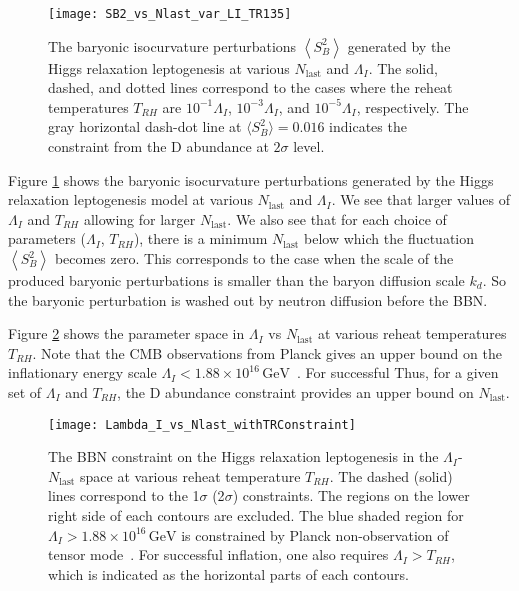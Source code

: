 \documentclass[11pt,a4paper]{article}
\begin{document}
\begin{figure}
\begin{centering}
\texttt{[image: SB2\_vs\_Nlast\_var\_LI\_TR135]} 
\par\end{centering}
\caption{The baryonic isocurvature perturbations $\left\langle S_{B}^{2}\right\rangle $ generated by the Higgs relaxation leptogenesis at various $N_{\mathrm{last}}$ and $\Lambda_{I}$. The solid, dashed, and dotted lines correspond to the cases where the reheat temperatures $T_{RH}$ are $10^{-1}\Lambda_{I}$, $10^{-3}\Lambda_{I}$, and $10^{-5}\Lambda_{I}$, respectively. The gray horizontal dash-dot line at $\langle S_B^2 \rangle = 0.016$ indicates the constraint from the D abundance at $2\sigma$ level. \label{fig:SB2 vs Nlast}}
\end{figure}

Figure \ref{fig:SB2 vs Nlast} shows the baryonic isocurvature perturbations generated by the Higgs relaxation leptogenesis model at various $N_{\mathrm{last}}$ and $\Lambda_{I}$. We see that larger values of $\Lambda_{I}$ and $T_{RH}$ allowing for larger $N_{\mathrm{last}}$. We also see that for each choice of parameters ($\Lambda_{I}$, $T_{RH}$), there is a minimum $N_{\mathrm{last}}$ below which the fluctuation $\left\langle S_{B}^{2}\right\rangle $ becomes zero. This corresponds to the case when the scale of the produced baryonic perturbations is smaller than the baryon diffusion scale $k_{d}$. So the baryonic perturbation is washed out by neutron diffusion before the BBN.

Figure \ref{fig:Lambda_I_vs_Nlast} shows the parameter space in $\Lambda_{I}$ vs $N_{\mathrm{last}}$ at various reheat temperatures $T_{RH}$. Note that the CMB observations from Planck gives an upper bound on the inflationary energy scale $\Lambda_{I}<1.88\times10^{16}\,\text{GeV}$~\cite{Ade:2015lrj}. For successful Thus, for a given set of $\Lambda_{I}$ and $T_{RH}$, the D abundance constraint provides an upper bound on $N_{\mathrm{last}}$.

\begin{figure}
\begin{centering}
\texttt{[image: Lambda\_I\_vs\_Nlast\_withTRConstraint]} 
\par\end{centering}
\caption{The BBN constraint on the Higgs relaxation leptogenesis in the $\Lambda_{I}$-$N_{\mathrm{last}}$ space at various reheat temperature $T_{RH}$. The dashed (solid) lines correspond to the 1$\sigma$ (2$\sigma$) constraints. The regions on the lower right side of each contours are excluded. The blue shaded region for $\Lambda_{I} > 1.88\times10^{16}\,\text{GeV}$ is constrained by Planck non-observation of tensor mode~\cite{Ade:2015lrj}. For successful inflation, one also requires $\Lambda_{I} > T_{RH}$, which is indicated as the horizontal parts of each contours.  \label{fig:Lambda_I_vs_Nlast}
}
\end{figure}
\end{document}
